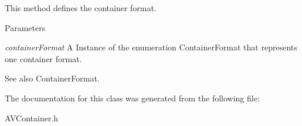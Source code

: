 This method defines the container format. 


\begin{DoxyParams}{Parameters}
\item[{\em containerFormat}]A Instance of the enumeration ContainerFormat that represents one container format. \end{DoxyParams}
\begin{DoxySeeAlso}{See also}
ContainerFormat. 
\end{DoxySeeAlso}


The documentation for this class was generated from the following file:\begin{DoxyCompactItemize}
\item 
AVContainer.h\end{DoxyCompactItemize}
